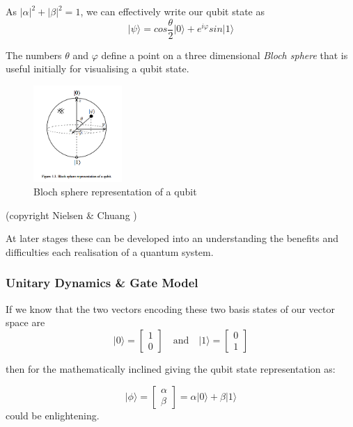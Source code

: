 As $\lvert\alpha\lvert^2 + \lvert\beta\lvert^2 = 1$, we can effectively write our qubit state as \cite{Nielsen:2010}
$$\lvert\psi\rangle = cos \frac{\theta}{2} \lvert0\rangle + e^{i\varphi} sin \lvert1\rangle $$

The numbers $\theta$ and $\varphi$ define a point on a three dimensional \emph{Bloch sphere} 
that is useful initially for visualising a qubit state.

\begin{figure}[ht] 
	\begin{adjustbox}{center}
		\includegraphics[width=0.3\textwidth, inner]{figures/blochsphere-nielsen-and-chuang-toc-and-chapter1-nov00.png}
	\end{adjustbox}
	\caption{Bloch sphere representation of a qubit }
	\label{fig:bloch_sphere}
\end{figure}
(copyright Nielsen \& Chuang \cite{Nielsen:2010})

At later stages these can be developed into an understanding the benefits and difficulties each 
realisation of a quantum system.

\subsubsection{Unitary Dynamics \& Gate Model}

If we know that the two vectors encoding these two basis states of our vector space are
$$\lvert0\rangle = \begin{bmatrix} 1 \\ 0 \end{bmatrix} \quad \textrm{and} \quad \lvert1\rangle = \begin{bmatrix} 0 \\ 1 \end{bmatrix}$$

then for the mathematically inclined giving the qubit state representation as:

$$\lvert\phi\rangle = \begin{bmatrix} \alpha \\ \beta \end{bmatrix} = \alpha\lvert0\rangle + \beta\lvert1\rangle$$
could be enlightening.

